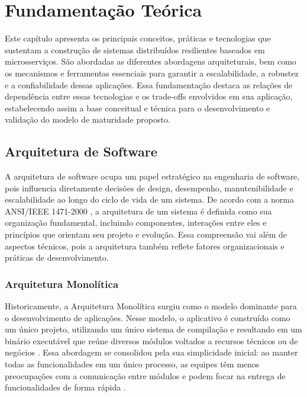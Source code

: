 \chapter{Fundamentação Teórica}

Este capítulo apresenta os principais conceitos, práticas e tecnologias que sustentam a construção de sistemas distribuídos resilientes baseados em microsserviços. São abordadas as diferentes abordagens arquiteturais, bem como os mecanismos e ferramentas essenciais para garantir a escalabilidade, a robustez e a confiabilidade dessas aplicações. Essa fundamentação destaca as relações de dependência entre essas tecnologias e os trade-offs envolvidos em sua aplicação, estabelecendo assim a base conceitual e técnica para o desenvolvimento e validação do modelo de maturidade proposto.

\section{Arquitetura de Software}

A arquitetura de software ocupa um papel estratégico na engenharia de software, pois influencia diretamente decisões de design, desempenho, manutenibilidade e escalabilidade ao longo do ciclo de vida de um sistema. De acordo com a norma ANSI/IEEE 1471-2000 \citep{Electrical2007}, a arquitetura de um sistema é definida como sua organização fundamental, incluindo componentes, interações entre eles e princípios que orientam seu projeto e evolução. Essa compreensão vai além de aspectos técnicos, pois a arquitetura também reflete fatores organizacionais e práticas de desenvolvimento.

\subsection{Arquitetura Monolítica}

Historicamente, a Arquitetura Monolítica surgiu como o modelo dominante para o desenvolvimento de aplicações. Nesse modelo, o aplicativo é construído como um único projeto, utilizando um único sistema de compilação e resultando em um binário executável que reúne diversos módulos voltados a recursos técnicos ou de negócios \citep{mendes2021arquitetura}. Essa abordagem se consolidou pela sua simplicidade inicial: ao manter todas as funcionalidades em um único processo, as equipes têm menos preocupações com a comunicação entre módulos e podem focar na entrega de funcionalidades de forma rápida \citep{PereiraDiniz2022}.

